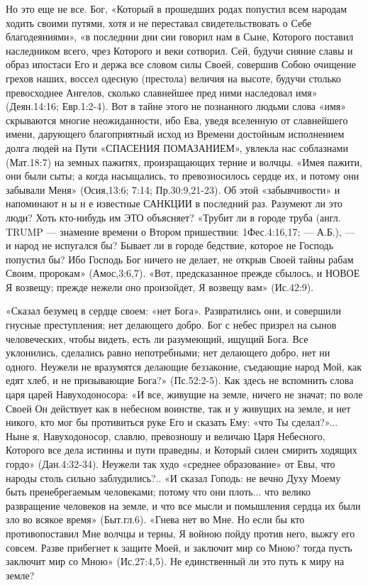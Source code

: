       Но это еще не все. Бог, «Который в прошедших родах попустил всем народам ходить своими путями, хотя и не переставал свидетельствовать о Себе благодеяниями», «в последнии дни сии говорил нам в Сыне, Которого поставил наследником всего, чрез Которого и веки сотворил. Сей, будучи сияние славы и образ ипостаси Его и держа все словом силы Своей, совершив Собою очищение грехов наших, воссел одесную (престола) величия на высоте, будучи столько превосходнее Ангелов, сколько славнейшее пред ними наследовал имя» (Деян.14:16; Евр.1:2-4). Вот в тайне этого не познанного людьми слова «имя» скрываются многие неожиданности, ибо Ева, уведя вселенную от славнейшего имени, дарующего благоприятный исход из Времени достойным исполнением долга людей на Пути «СПАСЕНИЯ ПОМАЗАНИЕМ», увлекла нас соблазнами (Мат.18:7) на земных пажитях, произращающих терние и волчцы. «Имея пажити, они были сыты; а когда насыщались, то превозносилось сердце их, и потому они забывали Меня» (Осия,13:6; 7:14;   Пр.30:9,21-23).  Об этой «забывчивости» и напоминают  н ы н е  известные САНКЦИИ в последний раз. Разумеют ли это люди? Хоть кто-нибудь им ЭТО объясняет?
     «Трубит ли в городе труба (англ. TRUMP --- знамение времени о Втором пришествии: 1Фес.4:16,17; --- А.Б.), --- и народ не испугался бы?  Бывает ли в городе бедствие, которое не Господь попустил бы?  Ибо Господь Бог ничего не делает, не открыв Своей тайны рабам Своим, пророкам» (Амос,3:6,7).
«Вот, предсказанное прежде сбылось, и НОВОЕ  Я возвещу;  прежде нежели оно произойдет, Я возвещу вам» (Ис.42:9).

                «Сказал безумец в сердце своем: «нет Бога». Развратились они, и совершили гнусные преступления;  нет делающего добро.   Бог с небес призрел на сынов человеческих, чтобы видеть, есть ли разумеющий, ищущий Бога.   Все уклонились, сделались равно непотребными; нет делающего добро, нет ни одного.   Неужели не вразумятся делающие беззаконие, съедающие народ Мой, как едят хлеб, и не призывающие Бога?» (Пс.52:2-5). Как здесь не вспомнить слова царя царей Навуходоносора: «И все, живущие на земле, ничего не значат; по воле Своей Он действует как в небесном воинстве, так и у живущих на земле, и нет никого, кто мог бы противиться руке Его и сказать Ему: «что Ты сделал?»...
Ныне я, Навуходоносор, славлю, превозношу и величаю Царя Небесного, Которого все дела истинны и пути праведны, и Который силен смирить ходящих гордо» (Дан.4:32-34).
                Неужели так худо «среднее образование» от Евы, что народы столь сильно заблудились?..
     «И сказал Гоподь: не вечно Духу Моему быть пренебрегаемым человеками; потому что они плоть... что велико развращение человеков на земле, и что все мысли и помышления сердца их были зло во всякое время» (Быт.гл.6).  «Гнева нет во Мне. Но если бы кто противопоставил Мне волчцы и терны, Я войною пойду против него, выжгу его совсем.   Разве прибегнет к защите Моей, и заключит мир со Мною?  тогда пусть заключит мир со Мною» (Ис.27:4,5). Не единственный ли это путь к миру на земле?

